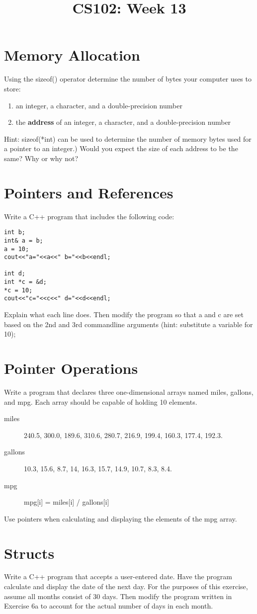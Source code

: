 \documentclass{article}
\begin{document}
\title{CS102: Week 13}

\maketitle
\section*{Memory Allocation}
Using the sizeof() operator determine the number of bytes your computer uses to store:
\begin{enumerate}
	\item an integer, a character, and a double-precision number
	\item the \textbf{address} of an integer, a character, and a double-precision number
\end{enumerate}
Hint: sizeof(*int) can be used to determine the number of memory bytes used for a pointer to an integer.) Would you expect the size of each address to be the same? Why or why not?
\section*{Pointers and References}
Write a C++ program that includes the following code:
\begin{lstlisting}
int b;
int& a = b;
a = 10;
cout<<"a="<<a<<" b="<<b<<endl;

int d;
int *c = &d;
*c = 10;
cout<<"c="<<c<<" d="<<d<<endl;
\end{lstlisting}
Explain what each line does. Then modify the program so that a and c are set based on the 2nd and 3rd commandline arguments (hint: substitute a variable for 10); 

\section*{Pointer Operations}
Write a program that declares three one-dimensional arrays named miles, gallons, and mpg. Each array should be capable of holding 10 elements.
\begin{description}
\item[miles] 240.5, 300.0, 189.6, 310.6, 280.7, 216.9, 199.4, 160.3, 177.4, 192.3. 
\item[gallons] 10.3, 15.6, 8.7, 14, 16.3, 15.7, 14.9, 10.7, 8.3,  8.4. 
\item[mpg] mpg[i] = miles[i] / gallons[i]
\end{description}
Use pointers when calculating and displaying the elements of the mpg array.

\section*{Structs}
Write a C++ program that accepts a user-entered date. Have the program calculate and display the date of the next day. For the purposes of this exercise, assume all months consist of 30 days. Then modify the program written in Exercise 6a to account for the actual number of days in each month.
\end{document}
